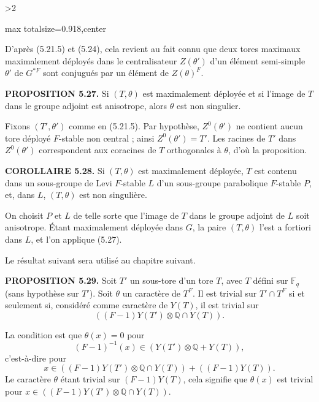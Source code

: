 \documentclass[9pt,twoside]{extarticle}
\newcommand{\EditionPage}[3]{%
  \ifnum#1>2\clearpage\fi
  \pdfbookmark[1]{Printed page #2}{fr-folio-#2}%
  \hypertarget{fr-physical-#1}{}%
  \noindent\begin{adjustbox}{max totalsize={\textwidth}{0.918\textheight},center}
  \begin{minipage}[t]{\textwidth}
  \fontsize{9.4}{11.1}\selectfont\justifying
  #3
  \end{minipage}
  \end{adjustbox}%
}
\begin{document}
\EditionPage{34}{135}{%
D'après (5.21.5) et (5.24), cela revient au fait connu que deux tores maximaux maximalement déployés dans le centralisateur \(Z(\theta')\) d'un élément semi-simple \(\theta'\) de \(G^{*F}\) sont conjugués par un élément de \(Z(\theta)^F\).\par

\noindent\textbf{PROPOSITION 5.27.} Si \((T,\theta)\) est maximalement déployée et si l'image de \(T\) dans le groupe adjoint est anisotrope, alors \(\theta\) est non singulier.\par

Fixons \((T',\theta')\) comme en (5.21.5). Par hypothèse, \(Z^0(\theta')\) ne contient aucun tore déployé \(F\)-stable non central ; ainsi \(Z^0(\theta')=T'\). Les racines de \(T'\) dans \(Z^0(\theta')\) correspondent aux coracines de \(T\) orthogonales à \(\theta\), d'où la proposition.\par

\noindent\textbf{COROLLAIRE 5.28.} Si \((T,\theta)\) est maximalement déployée, \(T\) est contenu dans un sous-groupe de Levi \(F\)-stable \(L\) d'un sous-groupe parabolique \(F\)-stable \(P\), et, dans \(L\), \((T,\theta)\) est non singulière.\par

On choisit \(P\) et \(L\) de telle sorte que l'image de \(T\) dans le groupe adjoint de \(L\) soit anisotrope. Étant maximalement déployée dans \(G\), la paire \((T,\theta)\) l'est a fortiori dans \(L\), et l'on applique (5.27).\par

Le résultat suivant sera utilisé au chapitre suivant.\par

\noindent\textbf{PROPOSITION 5.29.} Soit \(T'\) un sous-tore d'un tore \(T\), avec \(T\) défini sur \(\mathbb F_q\) (sans hypothèse sur \(T'\)). Soit \(\theta\) un caractère de \(T^F\). Il est trivial sur \(T'\cap T^F\) si et seulement si, considéré comme caractère de \(Y(T)\), il est trivial sur \[
((F-1)Y(T')\otimes\mathbb Q\cap Y(T)).
\]\par

La condition est que \(\theta(x)=0\) pour \[
(F-1)^{-1}(x)\in(Y(T')\otimes\mathbb Q+Y(T)),
\] c'est-à-dire pour \[
x\in((F-1)Y(T')\otimes\mathbb Q\cap Y(T))+((F-1)Y(T)).
\] Le caractère \(\theta\) étant trivial sur \((F-1)Y(T)\), cela signifie que \(\theta(x)\) est trivial pour \(x\in((F-1)Y(T')\otimes\mathbb Q\cap Y(T))\).\par

}
\end{document}
